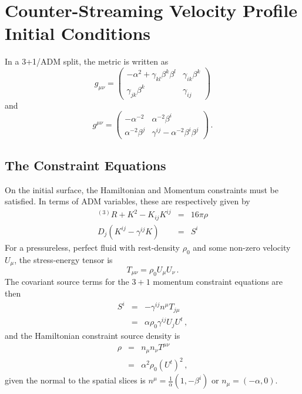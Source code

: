 \documentclass[english]{article}
\begin{document}
\section{Counter-Streaming Velocity Profile Initial Conditions}

In a 3+1/ADM split, the metric is written as
\begin{equation}
g_{\mu\nu}=\left(\begin{array}{cc}
-\alpha^{2}+\gamma_{kl}\beta^{k}\beta^{l} & \gamma_{ik}\beta^{k}\\
\gamma_{jk}\beta^{k} & \gamma_{ij}
\end{array}\right)
\end{equation}
and
\begin{equation}
g^{\mu\nu}=\left(\begin{array}{cc}
-\alpha^{-2} & \alpha^{-2}\beta^{i}\\
\alpha^{-2}\beta^{j} & \gamma^{ij}-\alpha^{-2}\beta^{i}\beta^{j}
\end{array}\right)\,.
\end{equation}


\subsection{The Constraint Equations}

On the initial surface, the Hamiltonian and Momentum constraints must
be satisfied. In terms of ADM variables, these are respectively given
by
\begin{eqnarray}
^{(3)}R+K^{2}-K_{ij}K^{ij} & = & 16\pi\rho\\
D_{j}(K^{ij}-\gamma^{ij}K) & = & S^{i}
\end{eqnarray}
For a pressureless, perfect fluid with rest-density $\rho_{0}$ and
some non-zero velocity $U_{\mu}$, the stress-energy tensor is 
\begin{equation}
T_{\mu\nu}=\rho_{0}U_{\mu}U_{\nu}\,.
\end{equation}
The covariant source terms for the $3+1$ momentum constraint equations
are then 
\begin{eqnarray}
S^{i} & = & -\gamma^{ij}n^{\mu}T_{j\mu}\\
 & = & \alpha\rho_{0}\gamma^{ij}U_{j}U^{t}\,,
\end{eqnarray}
and the Hamiltonian constraint source density is 
\begin{eqnarray}
\rho & = & n_{\mu}n_{\nu}T^{\mu\nu}\\
 & = & \alpha^{2}\rho_{0}(U^{t})^{2}\,,
\end{eqnarray}
given the normal to the spatial slices is $n^{\mu}=\frac{1}{\alpha}(1,-\beta^{i})$
or $n_{\mu}=(-\alpha,0)$. 
\end{document}
